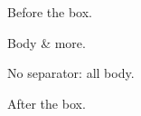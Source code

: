 Before the box.

\begin{tcolorbox}[breakable, title={A plain \textbf{title}}]
Body \& more.
\end{tcolorbox}

\begin{tcolorbox}[breakable]
No separator: all body.
\end{tcolorbox}

After the box.

